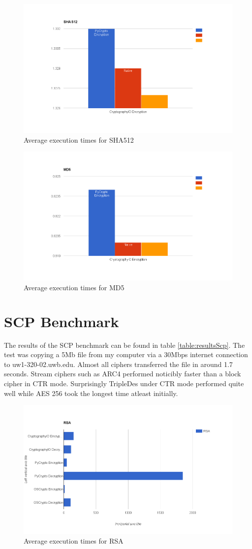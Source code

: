 \documentclass[10pt,conference]{IEEEtran}
\begin{document}
\begin{figure}
\centering
\includegraphics[width=0.7\linewidth]{./sha512}
\caption{Average execution times for SHA512}
\label{fig:sha512}
\end{figure}

\begin{figure}
\centering
\includegraphics[width=0.7\linewidth]{./md5}
\caption{Average execution times for MD5}
\label{fig:md5}
\end{figure}

\section{SCP Benchmark}

The results of the SCP benchmark can be found in table \ref{table:resultsScp}. The test was copying a 5Mb file from my computer via a 30Mbps internet connection to uw1-320-02.uwb.edu. Almost all ciphers transferred the file in around 1.7 seconds. Stream ciphers such as ARC4 performed noticibly faster than a block cipher in CTR mode. Surprisingly TripleDes under CTR mode performed quite well while AES 256 took the longest time atleast initially.


\begin{figure}
\centering
\includegraphics[width=0.7\linewidth]{./RSA}
\caption{Average execution times for RSA}
\label{fig:RSA}
\end{figure}
\end{document}
